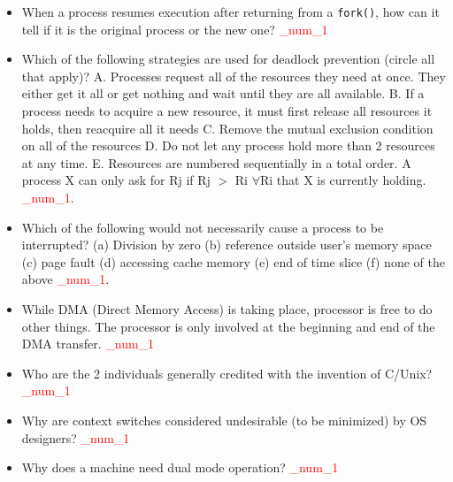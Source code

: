 \documentclass[9pt,landscape]{memoir}
\newcommand{\answer}[1]{\textcolor{red}{_num_1}}
\begin{document}
\begin{multicols}{6}
\begin{itemize}
    \item When a process resumes execution after returning from a \verb$fork()$, how can it tell if it is the original process or the new one? \answer{By the process ID which is returned by the \texttt{fork()} call. If it is equal to 0, it is the new one (child process); if it is a non-zero positive value, it is the original process.}
    \item Which of the following strategies are used for deadlock prevention (circle all that apply)?  A. Processes request all of the resources they need at once.  They either get it all or get nothing and wait until they are all available.  B. If a process needs to acquire a new resource, it must first release all resources it holds, then reacquire all it needs C. Remove the mutual exclusion condition on all of the resources D. Do not let any process hold more than 2 resources at any time.  E. Resources are numbered sequentially in a total order. A process X can only ask for Rj if Rj $>$ Ri  $\forall$Ri that X is currently holding.  \answer{A, B, E}.
    \item Which of the following would not necessarily cause a process to be interrupted? (a) Division by zero (b) reference outside user's memory space (c) page fault (d) accessing cache memory (e) end of time slice (f) none of the above \answer{d}.
    \item While DMA (Direct Memory Access) is taking place, processor is free to do other things. The processor is only involved at the beginning and end of the DMA transfer.  \answer{True.}
    \item Who are the 2 individuals generally credited with the invention of C/Unix?  \answer{Ken Thompson and Dennis Ritchie.}
    \item Why are context switches considered undesirable (to be minimized) by OS designers?  \answer{Because context switches waste a considerable amount of CPU time when they save and load the state of the processes.}
    \item Why does a machine need dual mode operation? \answer{To ensure proper operation, we must protect the operating system and all the programs and their data from any malfunctioning program.  The protection is accomplished by designating some of the machine instructions that may cause harm as "privileged" instructions.  Dual mode operations can protect the OS from errant users, and the users from one another.  It also prevents the abuse of priviledged instructions (such as 'interrupt enable/disable') by the user programs.}

\end{itemize}
\end{multicols}
\end{document}
